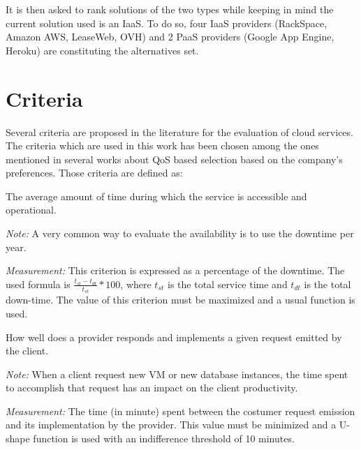 \documentclass[a4paper,11pt]{article}
\begin{document}
It is then asked to rank solutions of the two types while keeping in mind the current solution used is an IaaS. To do so, four IaaS providers (RackSpace, Amazon AWS, LeaseWeb, OVH) and 2 PaaS providers (Google App Engine, Heroku) are constituting the alternatives set.

\section{Criteria}
Several criteria are proposed in the literature for the evaluation of cloud services. The criteria which are used in this work has been chosen among the ones mentioned in several works about QoS based selection based on the company's preferences.
Those criteria are defined as:

\begin{description}[parsep=10pt,listparindent=\parindent,labelindent=\parindent,font=$\bullet$\ ]
  \item[Availability:] The average amount of time during which the service is accessible and operational.
    \par \emph{Note:} A very common way to evaluate the availability is to use the downtime per year.
    \par \emph{Measurement:} This criterion is expressed as a percentage of the downtime. The used formula is $\frac{t_{st}-t_{dt}}{t_{st}}*100$, where $t_{st}$ is the total service time and $t_{dt}$ is the total down-time. The value of this criterion must be maximized and a usual function is used.

  \item[Service efficiency:] How well does a provider responds and implements a given request emitted by the client.
     \par \emph{Note:} When a client request new VM or new database instances, the time spent to accomplish that request has an impact on the client productivity.
    \par \emph{Measurement:} The time (in minute) spent between the costumer request emission and its implementation by the provider. This value must be minimized and a U-shape function is used with an indifference threshold of 10 minutes.


\end{description}
\end{document}
